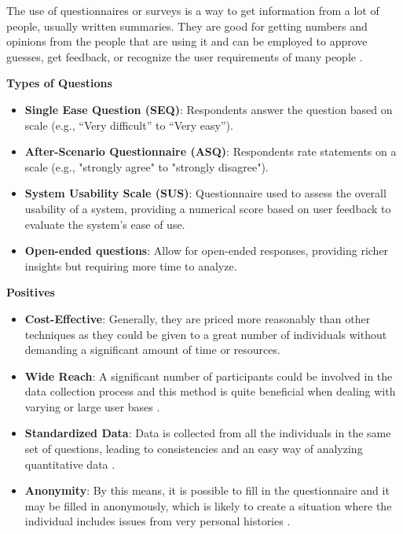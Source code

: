\documentclass[conference]{IEEEtran}
\begin{document}
The use of questionnaires or surveys is a way to get information from a lot of people, usually written summaries. They are good for getting numbers and opinions from the people that are using it and can be employed to approve guesses, get feedback, or recognize the user requirements of many people \cite{cite7}.

\textbf{Types of Questions}

\begin{itemize}
    \item \textbf{Single Ease Question (SEQ)}: Respondents answer the question based on scale (e.g., “Very difficult” to “Very easy”).
    \item \textbf{After-Scenario Questionnaire (ASQ)}: Respondents rate statements on a scale (e.g., "strongly agree" to "strongly disagree").
    \item \textbf{System Usability Scale (SUS)}: Questionnaire used to assess the overall usability of a system, providing a numerical score based on user feedback to evaluate the system's ease of use.
    \item \textbf{Open-ended questions}: Allow for open-ended responses, providing richer insights but requiring more time to analyze.
\end{itemize}

\textbf{Positives}

\begin{itemize}
    \item \textbf{Cost-Effective}: Generally, they are priced more reasonably than other techniques as they could be given to a great number of individuals without demanding a significant amount of time or resources\cite{cite10}.
    \item \textbf{Wide Reach}: A significant number of participants could be involved in the data collection process and this method is quite beneficial when dealing with varying or large user bases \cite{cite10}.
    \item \textbf{Standardized Data}: Data is collected from all the individuals in the same set of questions, leading to consistencies and an easy way of analyzing quantitative data \cite{cite10}.
    \item \textbf{Anonymity}: By this means, it is possible to fill in the questionnaire and it may be filled in anonymously, which is likely to create a situation where the individual includes issues from very personal histories \cite{cite10}.
\end{itemize}
\end{document}
